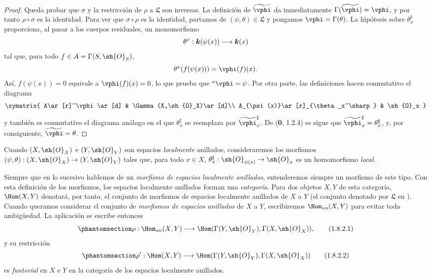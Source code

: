 \documentclass[oneside,10pt]{amsart}
\makeatletter
\newcommand{\ega@arrow}[2]{\mathchoice{#1}{#2}{#2}{#2}}
\renewcommand{\to}{\ega@arrow{\longrightarrow}{\rightarrow}}
\newcommand{\oldpage}[2][]{\marginnote{\normalfont\footnotesize\textbf{#1}~|~#2}\ignorespaces}
\let\EGAOriginalLabel\label
\renewcommand{\label}[1]{\phantomsection\EGAOriginalLabel{#1}}
\makeatother
\begin{document}
\begin{proof}
Queda probar que $\sigma$ y la restricción de $\rho$ a $\mathfrak{L}$
son inversas. La definición de $\widetilde{\vphi}$ da inmediatamente
$\Gamma(\widetilde{\vphi})=\vphi$, y por tanto $\rho\circ\sigma$ es la
identidad. Para ver que $\sigma\circ\rho$ es la identidad, partamos de
$(\psi,\theta)\in\mathfrak{L}$ y pongamos $\vphi=\Gamma(\theta)$. La
hipótesis sobre $\theta_x^\sharp$ proporciona, al pasar a los cuerpos
residuales, un monomorfismo
\[
  \theta^x:\boldsymbol{k}(\psi(x))\to\boldsymbol{k}(x)
\]
tal que, para todo $f\in A=\Gamma(S,\sh{O}_S)$,
\[
  \theta^x(f(\psi(x)))=\vphi(f)(x).
\]
Así, $f(\psi(x))=0$ equivale a $\vphi(f)(x)=0$, lo que prueba que
${}^a\vphi=\psi$. Por otra parte, las definiciones hacen conmutativo
el diagrama
\[
  \xymatrix{
    A\ar[r]^\vphi\ar[d] &
    \Gamma(X,\sh{O}_X)\ar[d]\\
    A_{\psi(x)}\ar[r]_{\theta_x^\sharp} &
    \sh{O}_x
  }
\]
y también es conmutativo el diagrama análogo en el que
$\theta_x^\sharp$ se reemplaza por $\widetilde{\vphi}_x^\sharp$. De
(\textbf 0, 1.2.4) se sigue que
$\widetilde{\vphi}_x^\sharp=\theta_x^\sharp$, y, por consiguiente,
$\widetilde{\vphi}=\theta$.
\end{proof}

\begin{env}[1.8.2]
\label{ega2:addendum:I.1.8.2}
Cuando $(X,\sh{O}_X)$ e $(Y,\sh{O}_Y)$ son espacios \emph{localmente}
anillados, consideraremos los morfismos
$(\psi,\theta):(X,\sh{O}_X)\to(Y,\sh{O}_Y)$ tales que, para todo
$x\in X$, $\theta_x^\sharp:\sh{O}_{\psi(x)}\to\sh{O}_x$ es un
homomorfismo \emph{local}.

Siempre que en lo sucesivo hablemos de un
\oldpage[II]{219}
\emph{morfismo de espacios localmente anillados}, entenderemos siempre
un morfismo de este tipo. Con esta definición de los morfismos, los
espacios localmente anillados forman una \emph{categoría}. Para dos objetos
$X,Y$ de esta categoría, $\Hom(X,Y)$ denotará, por tanto, el conjunto
de morfismos de espacios localmente anillados de $X$ a $Y$ (el
conjunto denotado por $\mathfrak{L}$ en ). Cuando queramos
considerar el conjunto de \emph{morfismos de espacios anillados} de $X$ a
$Y$, escribiremos $\Hom_{\mathit{an}}(X,Y)$ para evitar toda
ambigüedad. La aplicación  se escribe entonces
\begin{equation}
\label{ega2:addendum:I.1.8.2.1}
  \rho:\Hom_{\mathit{an}}(X,Y)
  \to\Hom(\Gamma(Y,\sh{O}_Y),\Gamma(X,\sh{O}_X)),
\tag{1.8.2.1}
\end{equation}
y su restricción
\begin{equation}
\label{ega2:addendum:I.1.8.2.2}
  \rho':\Hom(X,Y)
  \to\Hom(\Gamma(Y,\sh{O}_Y),\Gamma(X,\sh{O}_X))
\tag{1.8.2.2}
\end{equation}
es \emph{funtorial} en $X$ e $Y$ en la categoría de los espacios localmente
anillados.
\end{env}
\end{document}
